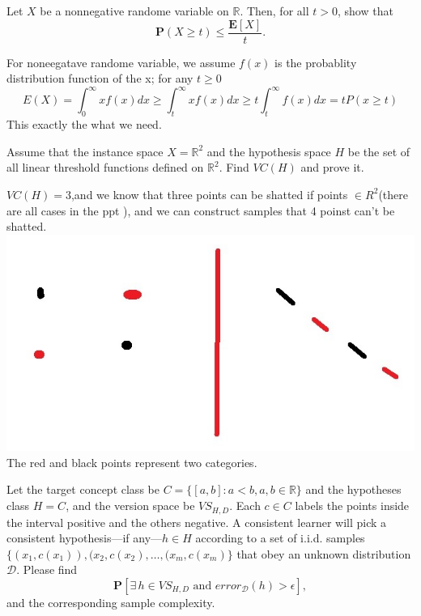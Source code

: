 \documentclass[11pt,letter,notitlepage]{article}
\begin{document}
\begin{exercise}
	Let $X$ be a nonnegative randome variable on $\mathbb{R}$. Then, for all $t>0$, show that
	$$\mathbf{P}(X\geq t)\leq \frac{\mathbf{E}[X]}{t}.$$
\end{exercise}

\begin{solution}
	   For noneegatave randome variable, we assume $f(x)$ is the probablity distribution function of the x;
	   for any  $t\geq 0$
		$$ E(X) = \int_{0}^{\infty} xf(x) dx \geq \int_{t}^{\infty} xf(x) dx  \geq t\int_{t}^{\infty} f(x) dx  = tP(x\geq t) $$ 
		\indent This exactly the what we need. 
\end{solution}


\begin{exercise}
	Assume that the instance space $X=\mathbb{R}^2$ and the hypothesis space $H$ be the set of all linear threshold functions defined on $\mathbb{R}^2$. Find $VC(H)$ and prove it.
\end{exercise}

\begin{solution}
	$VC(H) = 3$,and we know that three points can be shatted if points $\in R^2$(there are all cases in the ppt ), and we can construct  samples that 4 poinst can't be shatted.\\
\indent	\includegraphics[scale = 0.2]{case.jpg} \\
	\indent	The red and black points represent two categories.
\end{solution}

\begin{exercise} 
	Let the target concept class be $C=\{[a,b]:a<b, a,b\in\mathbb{R}\}$ and the hypotheses class $H=C$, and the version space be $VS_{H,D}$. Each $c\in C$ labels the points inside the interval positive and the others negative. A consistent learner will pick a consistent hypothesis---if any---$h\in H$ according to a set of i.i.d. samples $\{(x_1,c(x_1)),(x_2,c(x_2),\ldots,(x_m,c(x_m)\}$ that obey an unknown distribution $\mathcal{D}$. Please find 
	$$\mathbf{P}[\exists\, h\in VS_{H,D} \mbox{ and } error_{\mathcal{D}}(h)>\epsilon],$$
	and the corresponding sample complexity.
\end{exercise}
\end{document}

